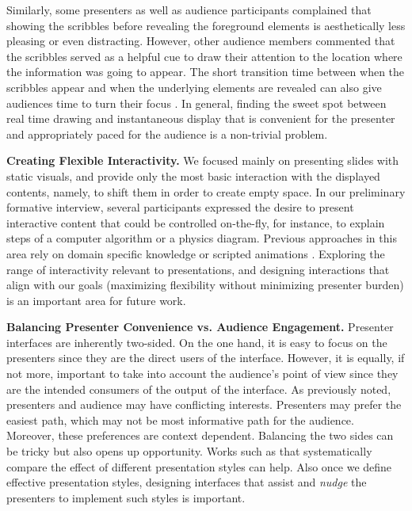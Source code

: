 Similarly, some presenters as well as audience participants complained that showing the scribbles before revealing the foreground elements is aesthetically less pleasing or even distracting. However, other audience members commented that the scribbles served as a helpful cue to draw their attention to the location where the information was going to appear. The short transition time between when the scribbles appear and when the underlying elements are revealed can also give audiences time to turn their focus  . In general, finding the sweet spot between real time drawing and instantaneous display that is convenient for the presenter and appropriately paced for the audience is a non-trivial problem.

\textbf{Creating Flexible Interactivity.} We focused mainly on presenting slides with static visuals, and provide only the most basic interaction with the displayed contents, namely, to shift them in order to create empty space. In our preliminary formative interview, several participants expressed the desire to present interactive content that could be controlled on-the-fly, for instance, to explain steps of a computer algorithm or a physics diagram. Previous approaches in this area rely on domain specific knowledge \cite{laviola2007mathpad,alvarado2001preserving} or scripted animations \cite{zongker2003creating}.  Exploring the range of interactivity relevant to presentations, and designing interactions that align with our goals (maximizing flexibility without minimizing presenter burden) is an important area for future work. 

\textbf{Balancing Presenter Convenience vs. Audience Engagement.} Presenter interfaces are inherently two-sided. On the one hand, it is easy to focus on the presenters since they are the direct users of the interface. However, it is equally, if not more, important to take into account the audience's point of view since they are the intended consumers of the output of the interface. As previously noted, presenters and audience may have conflicting interests. Presenters may prefer the easiest path, which may not be most informative path for the audience. Moreover, these preferences are context dependent.  Balancing the two sides can be tricky but also opens up opportunity. Works such as \cite{seth2010powerpoint, cross2013typerighting} that systematically compare the effect of different presentation styles can help. Also once we define effective presentation styles, designing interfaces that assist and \textit{nudge} the presenters to implement such styles is important. 
